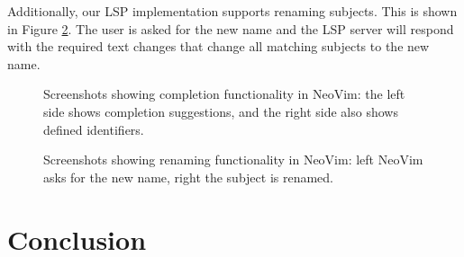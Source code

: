 \documentclass[
]{ceurart}
\begin{document}
Additionally, our LSP implementation supports renaming subjects.
This is shown in Figure \ref{fig:rename}. 
The user is asked for the new name and the LSP server will respond with the required text changes that change all matching subjects to the new name.

\begin{figure}
\centering
{}
\caption{Screenshots showing completion functionality in NeoVim: the left side shows completion suggestions, and the right side also shows defined identifiers.}
\label{fig:complete}
\end{figure}


\begin{figure}
\centering
{}
\caption{Screenshots showing renaming functionality in NeoVim: left NeoVim asks for the new name, right the subject is renamed.}
\label{fig:rename}
\end{figure}




\section{Conclusion}
\end{document}
